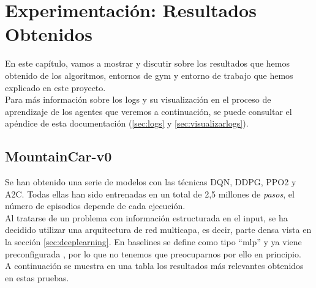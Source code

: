 \documentclass[11pt,fleqn]{book} %
\begin{document}
\chapter{Experimentación: Resultados Obtenidos}

En este capítulo, vamos a mostrar y discutir sobre los resultados que hemos obtenido de los algoritmos, entornos de gym y entorno de trabajo que hemos explicado en este proyecto. \\

Para más información sobre los logs y su visualización en el proceso de aprendizaje de los agentes que veremos a continuación, se puede consultar el apéndice de esta documentación (\ref{sec:logs} y \ref{sec:visualizarlogs}).

\section{MountainCar-v0}\label{expmountaincar}

Se han obtenido una serie de modelos con las técnicas DQN, DDPG, PPO2 y A2C. Todas ellas han sido entrenadas en un total de 2,5 millones de \textit{pasos}, el número de episodios depende de cada ejecución. \\

Al tratarse de un problema con información estructurada en el input, se ha decidido utilizar una arquitectura de red multicapa, es decir, parte densa vista en la sección \ref{sec:deeplearning}. En baselines se define como tipo ``mlp'' y ya viene preconfigurada \cite{article:redesbaselines}, por lo que no tenemos que preocuparnos por ello en principio. \\

A continuación se muestra en una tabla los resultados más relevantes obtenidos en estas pruebas.
\end{document}

